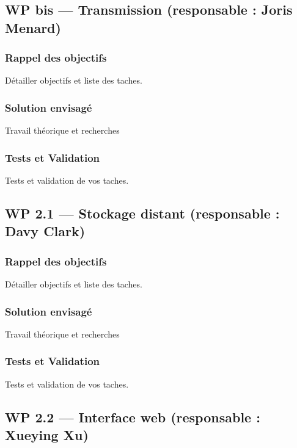 ﻿\documentclass[11pt]{article}
\begin{document}
\subsection{WP bis — Transmission (responsable : Joris Menard)}
\subsubsection{Rappel des objectifs}
Détailler objectifs et liste des taches.
\subsubsection{Solution envisagé}
Travail théorique et recherches
\subsubsection{Tests et Validation}
Tests et validation de vos taches.

\subsection{WP 2.1 — Stockage distant (responsable : Davy Clark)}
\subsubsection{Rappel des objectifs}
Détailler objectifs et liste des taches.
\subsubsection{Solution envisagé}
Travail théorique et recherches
\subsubsection{Tests et Validation}
Tests et validation de vos taches.

\subsection{WP 2.2 — Interface web (responsable : Xueying Xu)}
\end{document}

